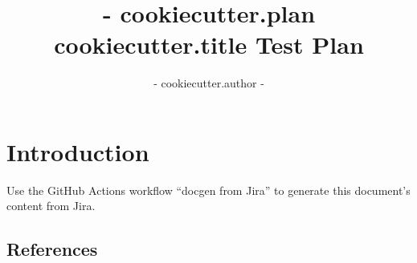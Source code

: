 \documentclass[DM,lsstdraft,toc]{lsstdoc}
\begin{document}
\def\milestoneName{ {{- cookiecutter.title -}} }
\def\milestoneId{ {{- cookiecutter.plan -}} }
\def\product{Data Management}


\title{ {{- cookiecutter.plan }} {{ cookiecutter.title }} Test Plan }
\setDocRef{\lsstDocType-\lsstDocNum}
\date{\vcsDate}
\author{ {{- cookiecutter.author -}} }




\maketitle

\section{Introduction}
Use the GitHub Actions workflow ``docgen from Jira'' to generate this document's content from Jira.

\subsection{References}
\label{sect:references}
\renewcommand{\refname}{}




\end{document}

